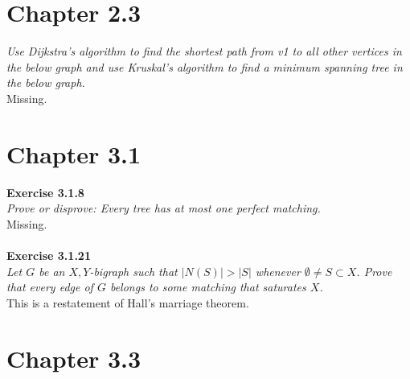 \section{Chapter 2.3}
\textit{Use Dijkstra’s algorithm to find the shortest path from v1 to all other vertices in the below graph and use Kruskal’s algorithm to find a minimum spanning tree in the below graph.}\\
Missing.
\section{Chapter 3.1}
\noindent
\textbf{Exercise 3.1.8}\\
\noindent
\textit{Prove or disprove: Every tree has at most one perfect matching.}\\
Missing.
\\\\
\noindent
\textbf{Exercise 3.1.21}\\
\noindent
\textit{Let $G$ be an $X,Y$-bigraph such that $|N(S)| > |S|$ whenever $\emptyset \ne S \subset X$. Prove that every edge of $G$ belongs to some matching that saturates $X$.}\\

This is a restatement of Hall's marriage theorem.



\section{Chapter 3.3}%
\label{subsec:label}


